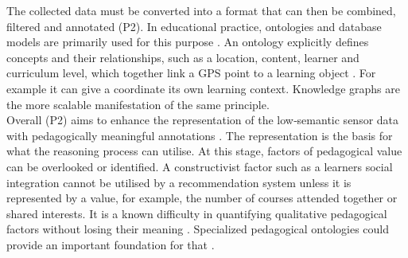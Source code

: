 \documentclass[runningheads]{llncs}
\begin{document}
The collected data must be converted into a format that can then be combined, filtered and annotated
(P2). In educational practice, ontologies and
database models are primarily used for this purpose \cite{hasanov_survey_2019}.
An ontology explicitly defines concepts and their relationships, such as a location,
content, learner and curriculum level, which together link a GPS point to a
learning object \cite{hasanov_survey_2019}. For example it can give a
coordinate its own learning context. Knowledge graphs are the
more scalable manifestation of the same principle.\\
Overall (P2) aims to enhance the representation of the low‐semantic sensor data with pedagogically meaningful annotations \cite{di_mitri_signals_2018}.
The representation is the basis for what the reasoning process can utilise.
At this stage, factors of pedagogical value can be overlooked or identified.
A constructivist factor such as a learners social integration cannot be utilised by a recommendation system unless it is represented by a value, for example, the number of courses attended together or shared interests. It is a known difficulty in quantifying qualitative pedagogical factors without losing their meaning \cite{abu-rasheed_context_2023}.
Specialized pedagogical ontologies could provide an important foundation for that  \cite{hasanov_survey_2019}.




\end{document}

